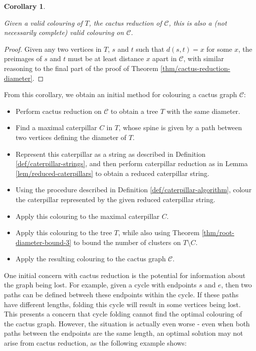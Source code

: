 \documentclass{mpaper}
\newtheorem{corollary}[theorem]{Corollary}
\begin{document}
\begin{corollary}
\label{cor/colouring-extension}

Given a valid colouring of $T$, the cactus reduction of $\mathcal{C}$, this is also a (not necessarily complete) valid colouring on $\mathcal{C}$.
\end{corollary}

\begin{proof}
Given any two vertices in $T$, $s$ and $t$ such that $d(s,t)=x$ for some $x$, the preimages of $s$ and $t$ must be at least distance $x$ apart in $\mathcal{C}$, with similar reasoning to the final part of the proof of Theorem \ref{thm/cactus-reduction-diameter}.
\end{proof}

From this corollary, we obtain an initial method for colouring a cactus graph $\mathcal{C}$:

\begin{itemize}
  \item Perform cactus reduction on $\mathcal{C}$ to obtain a tree $T$ with the same diameter.
  \item Find a maximal caterpillar $C$ in $T$, whose spine is given by a path between two vertices defining the diameter of $T$.
  \item Represent this caterpillar as a string as described in Definition \ref{def/caterpillar-strings}, and then perform caterpillar reduction as in Lemma \ref{lem/reduced-caterpillars} to obtain a reduced caterpillar string.
  \item Using the procedure described in Definition \ref{def/caterpillar-algorithm}, colour the caterpillar represented by the given reduced caterpillar string.
  \item Apply this colouring to the maximal caterpillar $C$.
  \item Apply this colouring to the tree $T$, while also using Theorem \ref{thm/root-diameter-bound-3} to bound the number of clusters on $T \setminus C$.
  \item Apply the resulting colouring to the cactus graph $\mathcal{C}$.
\end{itemize}

One initial concern with cactus reduction is the potential for information about the graph being lost. For example, given a cycle with endpoints $s$ and $e$, then two paths can be defined betweeh these endpoints within the cycle. If these paths have different lengths, folding this cycle will result in some vertices being lost. This presents a concern that cycle folding cannot find the optimal colouring of the cactus graph. However, the situation is actually even worse - even when both paths between the endpoints are the same length, an optimal solution may not arise from cactus reduction, as the following example shows:
\end{document}
